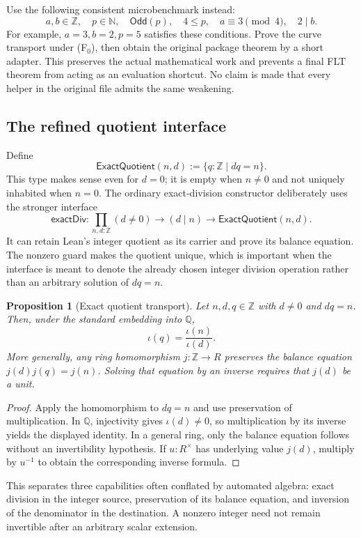 \documentclass[11pt,letterpaper]{article}
\newtheorem{proposition}[theorem]{Proposition}
\theoremstyle{definition}\newtheorem{definition}[theorem]{Definition}
\newcommand{\N}{\mathbb N}\newcommand{\Z}{\mathbb Z}\newcommand{\Q}{\mathbb Q}\newcommand{\R}{\mathbb R}\newcommand{\C}{\mathbb C}
\begin{document}
Use the following consistent microbenchmark instead:
\[
 a,b\in\Z,\quad p\in\N,\quad
 \mathsf{Odd}(p),\quad 4\le p,\quad
 a\equiv3\pmod4,\quad 2\mid b. \tag{F$_0$}
\]
For example, $a=3,b=2,p=5$ satisfies these conditions. Prove the curve transport under (F$_0$), then obtain the original package theorem by a short adapter. This preserves the actual mathematical work and prevents a final FLT theorem from acting as an evaluation shortcut. No claim is made that every helper in the original file admits the same weakening.

\subsection{The refined quotient interface}
Define
\[
 \mathsf{ExactQuotient}(n,d)
   :=\{q:\Z\mid d q=n\}.
\]
This type makes sense even for $d=0$; it is empty when $n\ne0$ and not uniquely inhabited when $n=0$. The ordinary exact-division constructor deliberately uses the stronger interface
\[
 \mathsf{exactDiv}:
 \prod_{n,d:\Z}(d\ne0)\to(d\mid n)\to
       \mathsf{ExactQuotient}(n,d).
\]
It can retain Lean's integer quotient as its carrier and prove its balance equation. The nonzero guard makes the quotient unique, which is important when the interface is meant to denote the already chosen integer division operation rather than an arbitrary solution of $dq=n$.

\begin{proposition}[Exact quotient transport]\label{prop:quotient}
Let $n,d,q\in\Z$ with $d\ne0$ and $dq=n$. Then, under the standard embedding into $\Q$,
\[
 \iota(q)=\frac{\iota(n)}{\iota(d)}.
\]
More generally, any ring homomorphism $j:\Z\to R$ preserves the balance equation $j(d)j(q)=j(n)$. Solving that equation by an inverse requires that $j(d)$ be a unit.
\end{proposition}
\begin{proof}
Apply the homomorphism to $dq=n$ and use preservation of multiplication. In $\Q$, injectivity gives $\iota(d)\ne0$, so multiplication by its inverse yields the displayed identity. In a general ring, only the balance equation follows without an invertibility hypothesis. If $u:R^\times$ has underlying value $j(d)$, multiply by $u^{-1}$ to obtain the corresponding inverse formula.
\end{proof}
This separates three capabilities often conflated by automated algebra: exact division in the integer source, preservation of its balance equation, and inversion of the denominator in the destination. A nonzero integer need not remain invertible after an arbitrary scalar extension.
\end{document}
